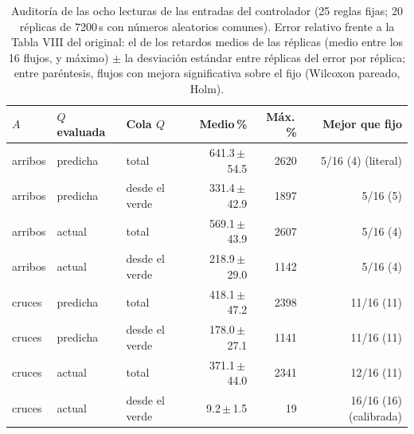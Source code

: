 \begin{table}[!t]
\caption{Auditoría de las ocho lecturas de las entradas del controlador (25 reglas fijas; 20 réplicas de 7200\,s con números aleatorios comunes). Error relativo frente a la Tabla VIII del original: el de los retardos medios de las réplicas (medio entre los 16 flujos, y máximo) $\pm$ la desviación estándar entre réplicas del error por réplica; entre paréntesis, flujos con mejora significativa sobre el fijo (Wilcoxon pareado, Holm).}
\label{tab:auditoria}
\centering
\scriptsize
\setlength{\tabcolsep}{2.2pt}
\begin{tabular}{@{}lllrrr@{}}
\toprule
$A$ & $Q$ evaluada & Cola $Q$ & Medio\,\% & Máx.\,\% & Mejor que fijo \\
\midrule
arribos & predicha & total & 641.3\,$\pm$\,54.5 & 2620 & 5/16 (4) (literal) \\
arribos & predicha & desde el verde & 331.4\,$\pm$\,42.9 & 1897 & 5/16 (5) \\
arribos & actual & total & 569.1\,$\pm$\,43.9 & 2607 & 5/16 (4) \\
arribos & actual & desde el verde & 218.9\,$\pm$\,29.0 & 1142 & 5/16 (4) \\
cruces & predicha & total & 418.1\,$\pm$\,47.2 & 2398 & 11/16 (11) \\
cruces & predicha & desde el verde & 178.0\,$\pm$\,27.1 & 1141 & 11/16 (11) \\
cruces & actual & total & 371.1\,$\pm$\,44.0 & 2341 & 12/16 (11) \\
cruces & actual & desde el verde & 9.2\,$\pm$\,1.5 & 19 & 16/16 (16) (calibrada) \\
\bottomrule
\end{tabular}
\end{table}
